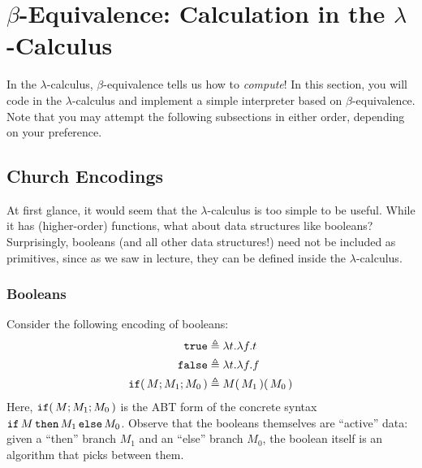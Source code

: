 \documentclass[11pt]{article}
\begin{document}
\section[Beta-Equivalence: Calculation in Lambda-Calculus]{$\beta$-Equivalence: Calculation in the $\lambda$-Calculus}

In the $\lambda$-calculus, $\beta$-equivalence tells us how to \emph{compute}!
In this section, you will code in the $\lambda$-calculus and implement a simple interpreter based on $\beta$-equivalence.
Note that you may attempt the following subsections in either order, depending on your preference.

\subsection{Church Encodings}

At first glance, it would seem that the $\lambda$-calculus is too simple to be useful.
While it has (higher-order) functions, what about data structures like booleans?
Surprisingly, booleans (and all other data structures!) need not be included as primitives, since as we saw in lecture, they can be defined inside the $\lambda$-calculus.

\subsubsection{Booleans}

Consider the following encoding of booleans:
\begin{align*}
  \mathtt{true}              &\mathrel{\triangleq} \lambda{t}{.}{\lambda{f}{.}{t}} \\
  \mathtt{false}              &\mathrel{\triangleq} \lambda{t}{.}{\lambda{f}{.}{f}} \\
  {\mathtt{if}}\mathtt{(}\,M;M_1;M_0\,\mathtt{)} &\mathrel{\triangleq} {{M}\mathtt{(}\,M_1\,\mathtt{)}}\mathtt{(}\,M_0\,\mathtt{)}
\end{align*}
Here, ${\mathtt{if}}\mathtt{(}\,M;M_1;M_0\,\mathtt{)}$ is the ABT form of the concrete syntax $\mathop{\mathtt{if}}\nolimits{M}\mathop{\mathtt{then}}\nolimits{M_1}\mathop{\mathtt{else}}\nolimits{M_0}$.
Observe that the booleans themselves are ``active'' data: given a ``then'' branch $M_1$ and an ``else'' branch $M_0$, the boolean itself is an algorithm that picks between them.
\end{document}
